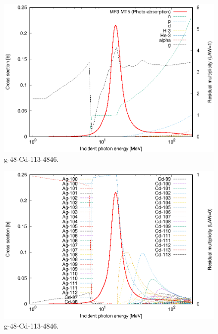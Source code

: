 \begin{figure}
 \includegraphics[width=\linewidth]{eps/g_48-Cd-113_4846.eps}
  \caption{g-48-Cd-113-4846.}
\end{figure}
\begin{figure}
 \includegraphics[width=\linewidth]{eps-law0/g_48-Cd-113_4846.eps}
 \caption{g-48-Cd-113-4846.}
\end{figure}
\newpage \clearpage

